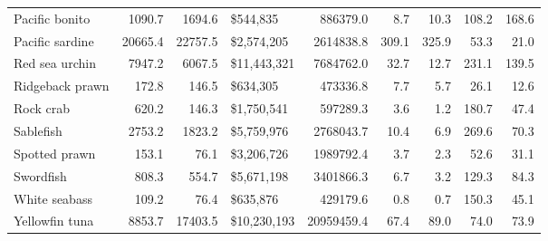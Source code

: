 \documentclass[
  letterpaper,
  DIV=11,
  numbers=noendperiod]{scrartcl}
\begin{document}
\begin{table}
{\begin{tabular}{lrrlrrrrr}
Pacific bonito & 1090.7 & 1694.6 & \$544,835 & 886379.0 & 8.7 & 10.3 & 108.2 & 168.6\\
\addlinespace
Pacific sardine & 20665.4 & 22757.5 & \$2,574,205 & 2614838.8 & 309.1 & 325.9 & 53.3 & 21.0\\
Red sea urchin & 7947.2 & 6067.5 & \$11,443,321 & 7684762.0 & 32.7 & 12.7 & 231.1 & 139.5\\
Ridgeback prawn & 172.8 & 146.5 & \$634,305 & 473336.8 & 7.7 & 5.7 & 26.1 & 12.6\\
Rock crab & 620.2 & 146.3 & \$1,750,541 & 597289.3 & 3.6 & 1.2 & 180.7 & 47.4\\
Sablefish & 2753.2 & 1823.2 & \$5,759,976 & 2768043.7 & 10.4 & 6.9 & 269.6 & 70.3\\
\addlinespace
Spotted prawn & 153.1 & 76.1 & \$3,206,726 & 1989792.4 & 3.7 & 2.3 & 52.6 & 31.1\\
Swordfish & 808.3 & 554.7 & \$5,671,198 & 3401866.3 & 6.7 & 3.2 & 129.3 & 84.3\\
White seabass & 109.2 & 76.4 & \$635,876 & 429179.6 & 0.8 & 0.7 & 150.3 & 45.1\\
Yellowfin tuna & 8853.7 & 17403.5 & \$10,230,193 & 20959459.4 & 67.4 & 89.0 & 74.0 & 73.9\\
\bottomrule
\end{tabular}}
\end{table}
\end{document}
